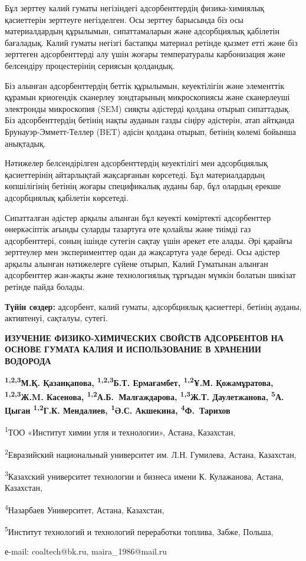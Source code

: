 Бұл зерттеу калий гуматы негізіндегі адсорбенттердің физика-химиялық
қасиеттерін зерттеуге негізделген. Осы зерттеу барысында біз осы
материалдардың құрылымын, сипаттамаларын және адсорбциялық қабілетін
бағаладық. Калий гуматы негізгі бастапқы материал ретінде қызмет етті
және біз зерттеген адсорбенттерді алу үшін жоғары температуралы
карбонизация және белсендіру процестерінің сериясын қолдандық.

Біз алынған адсорбенттердің беттік құрылымын, кеуектілігін және
элементтік құрамын криогендік сканерлеу зондтарының микроскопиясы және
сканерлеуші электронды микроскопия (SEM) сияқты әдістерді қолдана отырып
сипаттадық. Біз адсорбенттердің бетінің нақты ауданын газды сіңіру
әдістерін, атап айтқанда Брунауэр-Эмметт-Теллер (BET) әдісін қолдана
отырып, бетінің көлемі бойынша анықтадық.

Нәтижелер белсендірілген адсорбенттердің кеуектілігі мен адсорбциялық
қасиеттерінің айтарлықтай жақсарғанын көрсетеді. Бұл материалдардың
көпшілігінің бетінің жоғары спецификалық ауданы бар, бұл олардың ерекше
адсорбциялық қабілетін көрсетеді.

Сипатталған әдістер арқылы алынған бұл кеуекті көміртекті адсорбенттер
өнеркәсіптік ағынды суларды тазартуға өте қолайлы және тиімді газ
адсорбенттері, соның ішінде сутегін сақтау үшін әрекет ете алады. Әрі
қарайғы зерттеулер мен эксперименттер одан да жақсартуға уәде береді.
Осы әдістер арқылы алынған нәтижелерге сүйене отырып, Калий Гуматынан
алынған адсорбенттер жан-жақты және технологиялық тұрғыдан мүмкін
болатын шикізат ретінде пайда болады.

{\bfseries Түйін сөздер:} адсорбент, калий гуматы, адсорбциялық қасиеттері,
бетінің ауданы, активтенуі, сақталуы, сутегі.

\begin{articleheader}
{\bfseries ИЗУЧЕНИЕ ФИЗИКО-ХИМИЧЕСКИХ СВОЙСТВ АДСОРБЕНТОВ НА ОСНОВЕ ГУМАТА КАЛИЯ И ИСПОЛЬЗОВАНИЕ В ХРАНЕНИИ ВОДОРОДА}

{\bfseries
\textsuperscript{1,2,3}М.Қ. Қазанқапова\textsuperscript{\envelope },
\textsuperscript{1,2,3}Б.Т. Ермағамбет,
\textsuperscript{1,2}Ұ.М. Қожамұратова,
\textsuperscript{1,2,3}Ж.M. Касенова,
\textsuperscript{1,2}А.Б.~Малғаждарова,
\textsuperscript{1,3}Ж.Т. Даулетжанова,
\textsuperscript{5}А. Цыган
\textsuperscript{1,2}Г.К. Мендалиев,
\textsuperscript{1}Ә.С. Акшекина,
\textsuperscript{4}Ф.~Тарихов
}
\end{articleheader}

\begin{affiliation}
\textsuperscript{1}ТОО «Институт химии угля и технологии», Астана, Казахстан,

\textsuperscript{2}Евразийский национальный университет им. Л.Н. Гумилева, Астана, Казахстан,

\textsuperscript{3}Казахский университет технологии и бизнеса имени К. Кулажанова, Астана, Казахстан,

\textsuperscript{4}Назарбаев Университет, Астана, Казахстан,

\textsuperscript{5}Институт технологий и технологий переработки топлива, Забже, Польша,

е-mail: coaltech@bk.ru, maira\_1986@mail.ru
\end{affiliation}

